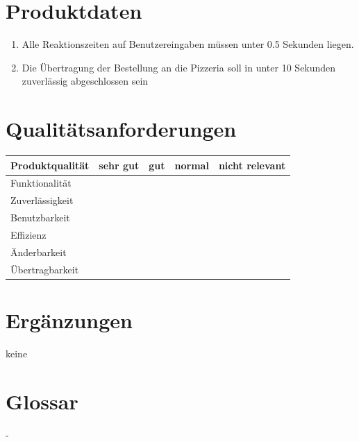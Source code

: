 \section{Produktdaten}
\begin{enumerate}[/LL10/]
	\item Alle Reaktionszeiten auf Benutzereingaben müssen unter 0.5  Sekunden liegen.
	\item Die Übertragung der Bestellung an die Pizzeria soll in unter 10 Sekunden zuverlässig abgeschlossen sein
\end{enumerate}
\section{Qualitätsanforderungen}
\begin{tabular}{l|cccc}
	Produktqualität&sehr gut&gut&normal&nicht relevant\\\hline
	Funktionalität&&&\texttimes&\\
	Zuverlässigkeit&&\texttimes&&\\
	Benutzbarkeit&\texttimes&&&\\
	Effizienz&&&&\texttimes\\
	Änderbarkeit&&&\texttimes&\\
	Übertragbarkeit&&&&\texttimes
\end{tabular}
\section{Ergänzungen}
keine
\section*{Glossar}
-
